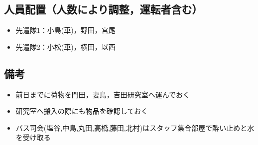 \subsection{人員配置（人数により調整，運転者含む）}
\begin{itemize}
\item 先遣隊1：小島(車)，野田，宮尾
\item 先遣隊2：小松(車)，横田，以西

\end{itemize}

\subsection{備考}
\begin{itemize}
\item 前日までに荷物を門田，妻鳥，吉田研究室へ運んでおく
\item 研究室へ搬入の際にも物品を確認しておく
\item バス司会(塩谷,中島,丸田,高橋,藤田,北村)はスタッフ集合部屋で酔い止めと水を受け取る
\end{itemize}


%
